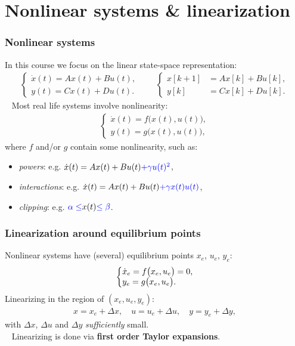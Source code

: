\section{Nonlinear systems \& linearization}
\begin{frame}
	\frametitle{Nonlinear systems}
	In this course we focus on the linear state-space representation:
	\begin{align*}
	\left\{ \begin{matrix} 
	\dot{x}(t) = A x(t) + B u(t), \\ 
	y(t) = C x(t) + D u(t).
	\end{matrix}\right.\quad\quad
	\left\{ \begin{matrix} 
	x[k+1] &= A x[k] + B u[k], \\ 
	y[k] &= C x[k] + D u[k].
	\end{matrix}\right.
	\end{align*}
	\pause
	\ \newline
	Most real life systems involve nonlinearity:
	\begin{align*}
	\left\{ \begin{matrix} 
	\dot{x}(t) = f\big(x(t), u(t)\big), \\ 
	y(t) = g\big(x(t), u(t)\big),
	\end{matrix}\right.
	\end{align*}
	where $f$ and/or $g$ contain some nonlinearity, such as:
	\begin{itemize}
		\item \emph{powers}: e.g. $\dot{x}(t) = A x(t) + B u(t) {\color{blue}+ \gamma u(t)^2}$,
		\item \emph{interactions}: e.g. $\dot{x}(t) = A x(t) + B u(t) {\color{blue}+ \gamma x(t) u(t)}$,
		\item \emph{clipping}: e.g. ${\color{blue}\alpha \leq }x(t){\color{blue}\leq \beta}$.
	\end{itemize}
\end{frame}

\begin{frame}
	\frametitle{Linearization around equilibrium points}
	Nonlinear systems have (several) equilibrium points $x_e$, $u_e$, $y_e$:
	\begin{align*}
	\left\{ \begin{matrix}
	\dot{x}_e = f\big(x_e, u_e\big)=0, \hfill \\
	y_e = g\big(x_e, u_e\big). \hfill
	\end{matrix}\right.
	\end{align*}
	\pause
	Linearizing in the region of $(x_e, u_e, y_e)$:
	\begin{align*}
	x = x_e + \Delta x, \quad u = u_e + \Delta u, \quad y = y_e + \Delta y,
	\end{align*}
	with $\Delta x$, $\Delta u$ and $\Delta y$ \emph{sufficiently} small.\\
	\ \newline
	\pause
	Linearizing is done via \textbf{first order Taylor expansions}.
\end{frame}

